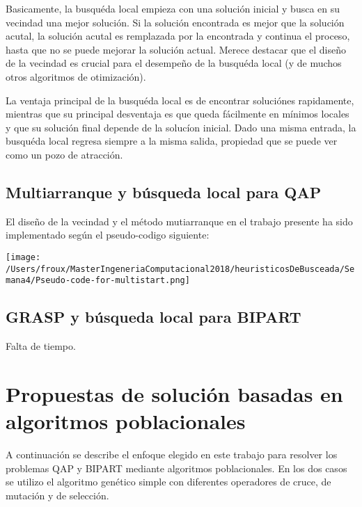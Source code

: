 \documentclass{article}
\begin{document}
 Basicamente, la busquéda local empieza con una solución inicial y busca en su vecindad una mejor solución. Si la solución encontrada es mejor que la solución acutal, la solución acutal es remplazada por la encontrada y continua el proceso, hasta que no se puede mejorar la solución actual. Merece destacar que el diseño de la vecindad es crucial para el desempeño de la busquéda local (y de muchos otros algoritmos de otimización). \newline
 
 La ventaja principal de la busquéda local es de encontrar soluciónes rapidamente, mientras que su principal desventaja es que queda fácilmente en mínimos locales y que su solución final depende de la solucíon inicial. Dado una misma entrada, la busquéda local regresa siempre a la misma salida, propiedad que se puede ver como un pozo de atracción.

 
 \subsection{Multiarranque y búsqueda local para QAP}
El diseño de la vecindad  y el método mutiarranque en el trabajo presente ha sido implementado según el pseudo-codigo siguiente:\newline
 
  \begin{center} 
 \texttt{[image: /Users/froux/MasterIngeneriaComputacional2018/heuristicosDeBusceada/Semana4/Pseudo-code-for-multistart.png]}
 \end{center}
 
 \subsection{GRASP y búsqueda local para BIPART}
  Falta de tiempo.
  
  \section{Propuestas de solución basadas en algoritmos poblacionales}
  A continuación se describe el enfoque elegido en este trabajo para resolver los problemas QAP y BIPART mediante algoritmos poblacionales.
  En los dos casos se utilizo el algoritmo genético simple con diferentes operadores de cruce, de mutación y de selección. 
\end{document}

